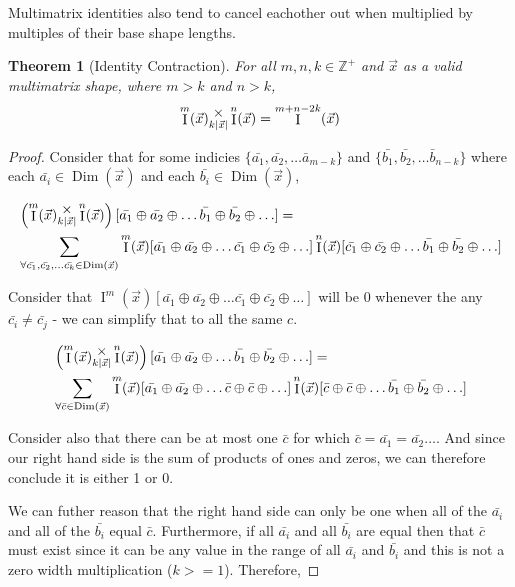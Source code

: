 \documentclass[12pt]{article}
\theoremstyle{definition}
\theoremstyle{plain}
\newtheorem{theorem}{Theorem}[section]
\theoremstyle{ppart}
\DeclareMathOperator{\Dim}{Dim}
\DeclareMathOperator{\Ident}{I}
\newcommand{\mmult}[1]{\text{\raisebox{1ex}{$\underset{#1}{\times}$}}}
\begin{document}
Multimatrix identities also tend to cancel eachother out when multiplied by
multiples of their base shape lengths.

\begin{landscape}
\begin{theorem}[Identity Contraction]
For all $m, n, k \in \mathbb{Z}^+$ and $\vec{x}$ as a valid multimatrix shape,
where $m > k$ and $n > k$,
\[ \Ident^m(\vec{x}) \mmult{k|\vec{x}|} \Ident^n(\vec{x}) = \Ident^{m+n-2k}(\vec{x}) \]
\end{theorem}
\begin{proof}
Consider that for some indicies
$\{\bar{a_1}, \bar{a_2}, \ldots \bar{a}_{m-k}\}$
and $\{\bar{b_1}, \bar{b_2}, \ldots \bar{b}_{n-k}\}$ where each
$\bar{a_i} \in \Dim(\vec{x})$ and each $\bar{b_i} \in \Dim(\vec{x})$,

\begin{align*}
&\left( \Ident^m(\vec{x}) \mmult{k|\vec{x}|} \Ident^n(\vec{x}) \right)
[\bar{a_1} \oplus \bar{a_2} \oplus \ldots \bar{b_1} \oplus \bar{b_2} \oplus \ldots] = \\
&\sum_{\forall \bar{c_1}, \bar{c_2}, \ldots \bar{c_k} \in \Dim(\vec{x})}
\Ident^m(\vec{x})
[\bar{a_1} \oplus \bar{a_2} \oplus \ldots \bar{c_1} \oplus \bar{c_2} \oplus \ldots]
\Ident^n(\vec{x})
[\bar{c_1} \oplus \bar{c_2} \oplus \ldots \bar{b_1} \oplus \bar{b_2} \oplus \ldots]
\end{align*}

Consider that $\Ident^m(\vec{x})
[\bar{a_1} \oplus \bar{a_2} \oplus \ldots \bar{c_1} \oplus \bar{c_2} \oplus \ldots]$
will be 0 whenever the any $\bar{c_i} \ne \bar{c_j}$ - we can simplify that to all
the same $c$.

\begin{align*}
&\left( \Ident^m(\vec{x}) \mmult{k|\vec{x}|} \Ident^n(\vec{x}) \right)
[\bar{a_1} \oplus \bar{a_2} \oplus \ldots \bar{b_1} \oplus \bar{b_2} \oplus \ldots] = \\
&\sum_{\forall \bar{c} \in \Dim(\vec{x})}
\Ident^m(\vec{x})
[\bar{a_1} \oplus \bar{a_2} \oplus \ldots \bar{c} \oplus \bar{c} \oplus \ldots]
\Ident^n(\vec{x})
[\bar{c} \oplus \bar{c} \oplus \ldots \bar{b_1} \oplus \bar{b_2} \oplus \ldots]
\end{align*}

Consider also that there can be at most one $\bar{c}$ for which
$\bar{c} = \bar{a_1} = \bar{a_2} \ldots$. And since our right hand side is
the sum of products of ones and zeros, we can therefore conclude it is either 1 or 0.

We can futher reason that the right hand side can only be one when all of the
$\bar{a_i}$ and all of the $\bar{b_i}$ equal $\bar{c}$. Furthermore, if all
$\bar{a_i}$ and all $\bar{b_i}$ are equal then that $\bar{c}$ must exist since it can
be any value in the range of all $\bar{a_i}$ and $\bar{b_i}$ and this is not a
zero width multiplication ($k >= 1$). Therefore,


\end{proof}
\end{landscape}
\end{document}
